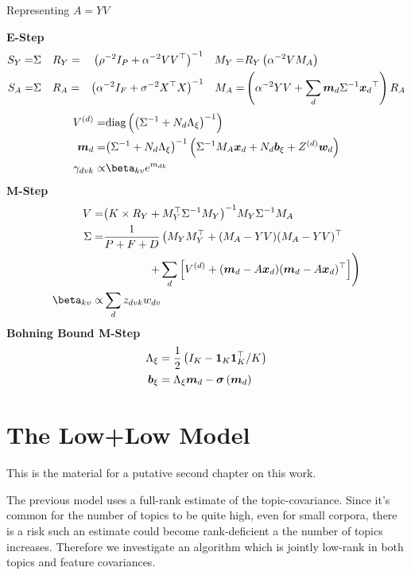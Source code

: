 \begin{algorithm}
\caption{Representing $A=YV$}
\label{alg:yv}
$\text{ }$\\
{\bf E-Step}
    \begin{align*}
        S_Y = & \Sigma \quad R_Y = & {\left( \rho^{-2} I_P + \alpha^{-2}V V ^\top \right)}^{-1}
        \quad M_Y = & R_Y \left( \alpha^{-2} V M_A \right) \\
        S_A = & \Sigma \quad R_A = & {\left( \alpha^{-2} I_F + \sigma^{-2} X^\top X \right)}^{-1} 
        \quad M_A = & \left(\alpha^{-2} YV + \sum_d \bm m_d {\Sigma}^{-1} { \bm x_d }^\top\right)R_A
    \end{align*}
    \begin{align*}
         \Vd = & \diag{\invb{\inv{\Sigma} + N_d \Axi}}\\
         \md = & \invb{\inv{\Sigma} + N_d \Axi} \left(\inv{\Sigma} M_A \xd  + N_d \bxi + Z^{(d)}\vv{w}_d \right )\\
        \gamma_{dvk} \propto & \beta_{kv} e^{m_{dk}} 
\end{align*}
{\bf M-Step}
\begin{align*}
    V = & \invb{K \times R_Y + M_Y\T \inv{\Sigma} M_Y}M_Y \inv{\Sigma} M_A \\
    \Sigma = & \frac{1}{P+F+D} \left(M_Y M_Y\T + (M_A - Y V)(M_A - Y V)\T \right. \\
        & \qquad \qquad \left. + \sum_d \left[ \Vd + (\md - A \xd)(\md - A\xd)\T \right] \right)\\
     \beta_{kv} \propto & \sum_d z_{dvk} w_{dv} 
\end{align*}
{\bf Bohning Bound M-Step}
    \begin{align*}
        { \Lambda_{\xi} } & = \frac{1}{2} \left(I_K - \mathbf{1}_K\mathbf{1}_K^\top / K  \right) \\
        { \bm b_{\xi} } & = { \Lambda_{\xi} } \bm m_d  - { \bm \sigma\left( \bm m_d \right) }
    \end{align*}
\end{algorithm}

\section{The Low+Low Model}
This is the material for a putative second chapter on this work.

The previous model uses a full-rank estimate of the topic-covariance. Since it's common for the number of topics to be quite high, even for small corpora, there is a risk such an estimate could become rank-deficient a the number of topics increases. Therefore we investigate an algorithm which is jointly low-rank in both topics and feature covariances.

